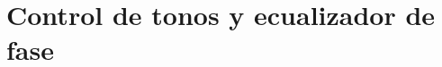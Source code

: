 \documentclass[../../tc_tp3_main.tex]{subfiles}
\begin{document}
\chapter{Control de tonos y ecualizador de fase}
\end{document}
